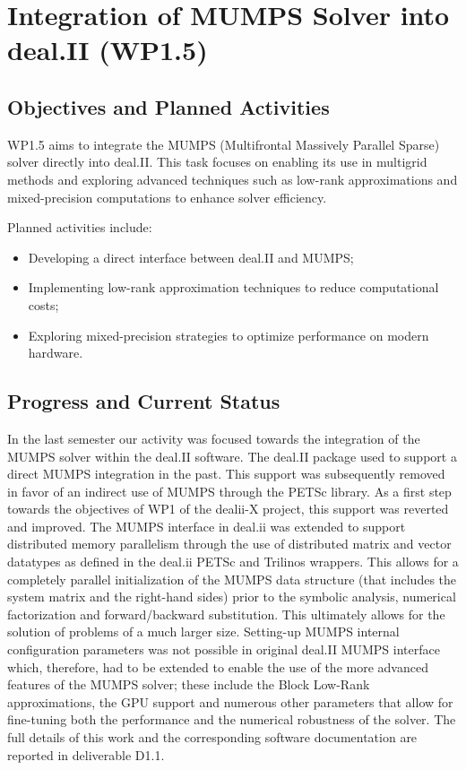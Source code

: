 \documentclass[a4paper,12pt]{article}
\begin{document}
\section{Integration of MUMPS Solver into deal.II (WP1.5)}
    \subsection{Objectives and Planned Activities}
    WP1.5 aims to integrate the MUMPS (Multifrontal Massively Parallel Sparse) solver directly into deal.II. This task focuses on enabling its use in multigrid methods and exploring advanced techniques such as low-rank approximations and mixed-precision computations to enhance solver efficiency.

    Planned activities include:
    \begin{itemize}
        \item Developing a direct interface between deal.II and MUMPS;
        \item Implementing low-rank approximation techniques to reduce computational costs;
        \item Exploring mixed-precision strategies to optimize performance on modern hardware.
    \end{itemize}

    \subsection{Progress and Current Status}
  In the last semester our activity was focused towards the integration of the MUMPS solver within the deal.II software. The deal.II package used to support a direct MUMPS integration in the past. This support was subsequently removed in favor of an indirect use of MUMPS through the PETSc library. As a first step towards the objectives of WP1 of the dealii-X
project, this support was reverted and improved. The MUMPS interface in deal.ii was extended to support distributed memory parallelism through the use of distributed matrix and vector datatypes as defined in the deal.ii PETSc and Trilinos wrappers. This allows for a completely parallel initialization of the MUMPS data structure (that includes the system matrix and the right-hand sides) prior to the symbolic analysis, numerical factorization and forward/backward substitution. This ultimately allows for the solution of problems of a much larger size. Setting-up MUMPS internal configuration parameters was not possible in original
deal.II MUMPS interface which, therefore, had to be extended to enable the use of the more advanced features of the MUMPS solver; these include the Block Low-Rank approximations, the GPU support and numerous other parameters that allow for fine-tuning both the performance and the numerical robustness of the solver. The full details of this work and the corresponding software documentation are reported in deliverable D1.1.


%

    
\label{MyLastPage}
\end{document}
